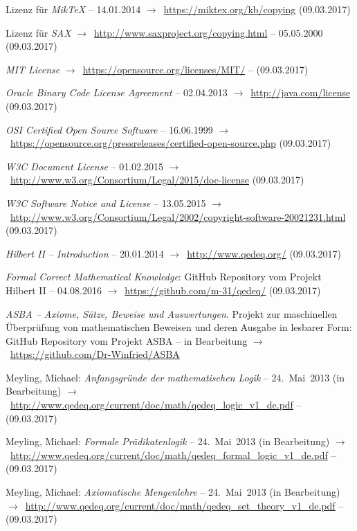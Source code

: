 \documentclass[english,ngerman,parskip=half,headsepline,footsepline,
	fleqn,notitlepage]{scrreprt}
\newcommand*{\tourl}[1]{$\rightarrow$~\url{#1}}
\begin{document}
\begin{flushleft}
\begin{thebibliography}{12}
			Lizenz für \emph{MikTeX}
			-- 14.01.2014
			\tourl{https://miktex.org/kb/copying}
			(09.03.2017)

			Lizenz für \emph{SAX}
			\tourl{http://www.saxproject.org/copying.html}
			-- 05.05.2000 (09.03.2017)

			\emph{MIT License}
			\tourl{https://opensource.org/licenses/MIT/}
			-- (09.03.2017)

			\emph{Oracle Binary Code License Agreement}
			-- 02.04.2013
			\tourl{http://java.com/license}
			(09.03.2017)

			\emph{OSI Certified Open Source Software}
			-- 16.06.1999
			\tourl{https://opensource.org/pressreleases/certified-open-source.php}
			(09.03.2017)

			\emph{W3C Document License} -- 01.02.2015
			\tourl{http://www.w3.org/Consortium/Legal/2015/doc-license}
			(09.03.2017)

			\emph{W3C Software Notice and License}
			-- 13.05.2015
			\tourl{http://www.w3.org/Consortium/Legal/2002/copyright-software-20021231.html}
			(09.03.2017)

			\emph{Hilbert II -- Introduction}
			-- 20.01.2014
			\tourl{http://www.qedeq.org/}
			(09.03.2017)

			\emph{Formal Correct Mathematical Knowledge}:
			GitHub Repository vom Projekt Hilbert II
			-- 04.08.2016
			\tourl{https://github.com/m-31/qedeq/}
			(09.03.2017)

			\emph{ASBA
			-- Axiome, Sätze, Beweise und Auswertungen}.
			Projekt zur maschinellen Überprüfung von mathematischen Beweisen
			und deren Ausgabe in lesbarer Form:
			GitHub Repository vom Projekt ASBA
			-- in Bearbeitung
			\tourl{https://github.com/Dr-Winfried/ASBA}

			Meyling, Michael:
			\emph{Anfangsgründe der mathematischen Logik}
			-- 24.~Mai~2013 (in Bearbeitung)
			\tourl{http://www.qedeq.org/current/doc/math/qedeq_logic_v1_de.pdf}
			-- (09.03.2017)

			Meyling, Michael:
			\emph{Formale Prädikatenlogik}
			-- 24.~Mai~2013 (in Bearbeitung)
			\tourl{http://www.qedeq.org/current/doc/math/qedeq_formal_logic_v1_de.pdf}
			-- (09.03.2017)

			Meyling, Michael:
			\emph{Axiomatische Mengenlehre}
			-- 24.~Mai~2013 (in Bearbeitung)
			\tourl{http://www.qedeq.org/current/doc/math/qedeq_set_theory_v1_de.pdf}
			-- (09.03.2017)


\end{thebibliography}
\end{flushleft}
\end{document}
